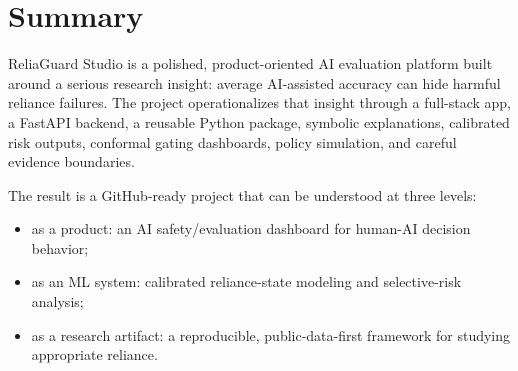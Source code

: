 \documentclass[11pt]{article}
\newcommand{\product}{ReliaGuard Studio}
\begin{document}
\section{Summary}

\product{} is a polished, product-oriented AI evaluation platform built around a serious research insight: average AI-assisted accuracy can hide harmful reliance failures. The project operationalizes that insight through a full-stack app, a FastAPI backend, a reusable Python package, symbolic explanations, calibrated risk outputs, conformal gating dashboards, policy simulation, and careful evidence boundaries.

The result is a GitHub-ready project that can be understood at three levels:

\begin{itemize}[leftmargin=*]
  \item as a product: an AI safety/evaluation dashboard for human-AI decision behavior;
  \item as an ML system: calibrated reliance-state modeling and selective-risk analysis;
  \item as a research artifact: a reproducible, public-data-first framework for studying appropriate reliance.
\end{itemize}
\end{document}
